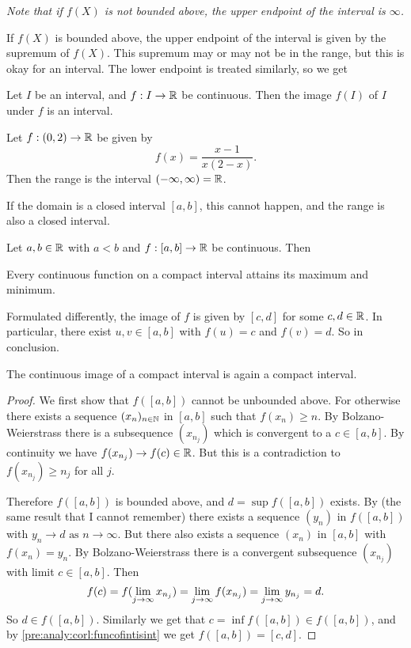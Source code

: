 \documentclass[10pt, a4paper]{article}
\newcommand{\seq}[1][x]{(#1_n)_{n \in \N}}
\newcommand{\limas}[3][n]{#2 \rightarrow #3 \text{ as } #1 \rightarrow \infty}
\begin{document}
\textit{Note that if $f(X)$ is not bounded above,
the upper endpoint of the interval is $\infty$.}

If $f(X)$ is bounded above,
the upper endpoint of the interval is given by the supremum of $f(X)$.
This supremum may or may not be in the range,
but this is okay for an interval.
The lower endpoint is treated similarly,
so we get

\begin{corollary}\label{pre:analy:corl:funcofintisint}
    Let $I$ be an interval,
    and $f : I \rightarrow \R$ be continuous.
    Then the image $f(I)$ of $I$ under $f$ is an interval.
\end{corollary}

\begin{example}
    Let $f : (0, 2) \rightarrow \R$ be given by
    \[
    f(x) = \frac{x - 1}{x(2 - x)}.
    \]
    Then the range is the interval $(-\infty, \infty) = \R$.
\end{example}

If the domain is a closed interval $[a, b]$,
this cannot happen,
and the range is also a closed interval.

\begin{theorem}
    Let $a, b \in \R$ with $a < b$ and $f : [a, b] \rightarrow \R$ be continuous.
    Then
    
    Every continuous function on a compact interval attains its maximum and minimum.

    Formulated differently,
    the image of $f$ is given by $[c, d]$ for some $c, d \in \R$.
    In particular,
    there exist $u, v \in [a, b]$ with $f(u) = c$ and $f(v) = d$.
    So in conclusion.

    The continuous image of a compact interval is again a compact interval.

    \begin{proof}
        We first show that $f([a, b])$ cannot be unbounded above.
        For otherwise there exists a sequence $\seq$ in $[a, b]$ such that $f(x_n) \geq n$.
        By Bolzano-Weierstrass there is a subsequence $(x_{n_j})$ which is convergent to a $c \in [a, b]$.
        By continuity we have $f(x_{n_j}) \rightarrow f(c) \in \R$.
        But this is a contradiction to $f(x_{n_j}) \geq n_j$ for all $j$.

        Therefore $f([a, b])$ is bounded above,
        and $d = \sup{f([a, b])}$ exists.
        By
        (the same result that I cannot remember)
        there exists a sequence $(y_n)$ in $f([a, b])$ with $\limas{y_n}{d}$.
        But there also exists a sequence $(x_n)$ in $[a, b]$ with $f(x_n) = y_n$.
        By Bolzano-Weierstrass there is a convergent subsequence $(x_{n_j})$ with limit $c \in [a, b]$.
        Then
        \[
        f(c) = f(\liminfty[j]x_{n_j}) = \liminfty[j]f(x_{n_j}) = \liminfty[j]y_{n_j} = d.
        \]
        So $d \in f([a, b])$.
        Similarly we get that $c = \inf{f([a, b])} \in f([a, b])$,
        and by \autoref{pre:analy:corl:funcofintisint} we get $f([a, b]) = [c, d]$.
    \end{proof}
\end{theorem}
\end{document}
